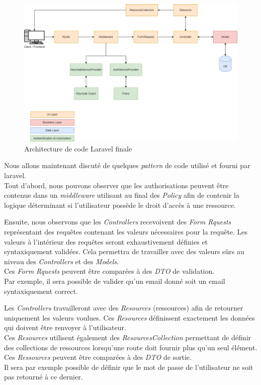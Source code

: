 \documentclass[
    iai, %
    il, %
]{heig-tb}
\begin{document}
\begin{center}
    \begin{figure}
        \includegraphics[width=\textwidth]{./assets/figures/architecture-code-finale.drawio.png}
        \caption{Architecture de code Laravel finale \label{architecture-code-finale}}
    \end{figure}
\end{center}

Nous allons maintenant discuté de quelques \emph{pattern} de code utilisé et fourni par \Gls{laravel}.\\
Tout d'abord, nous pouvons observer que les authorisations peuvent être contenue dans un \emph{middleware} utilisant au final des \emph{Policy} afin de contenir la logique déterminant si l'utilisateur possède le droit d'accès à une ressource.

Ensuite, nous observons que les \emph{Controllers} recevoivent des \emph{Form Rquests} représentant des requêtes contenant les valeurs nécessaires pour la requête. Les valeurs à l'intérieur des requêtes seront exhaustivement définies et syntaxiquement validées. Cela permettra de travailler avec des valeurs sûrs au niveau des \emph{Controllers} et des \emph{Models}. \\
Ces \emph{Form Rquests} peuvent être comparées à des \emph{DTO} de validation. \\
Par exemple, il sera possible de valider qu'un email donné soit un email syntaxiquement correct.

Les \emph{Controllers} travailleront avec des \emph{Resources} (ressources) afin de retourner uniquement les valeurs voulues. Ces \emph{Resources} définissent exactement les données qui doivent être renvoyer à l'utilisateur. \\
Ces \emph{Resources} utilisent également des \emph{ResourcesCollection} permettant de
définir des collections de ressources lorsqu'une route doit fournir plus qu'un seul élément. \\
Ces \emph{Ressources} peuvent être comparées à des \emph{DTO} de sortie. \\
Il sera par exemple possible de définir que le mot de passe de l'utilisateur ne soit
pas retourné à ce dernier. \\
\end{document}
